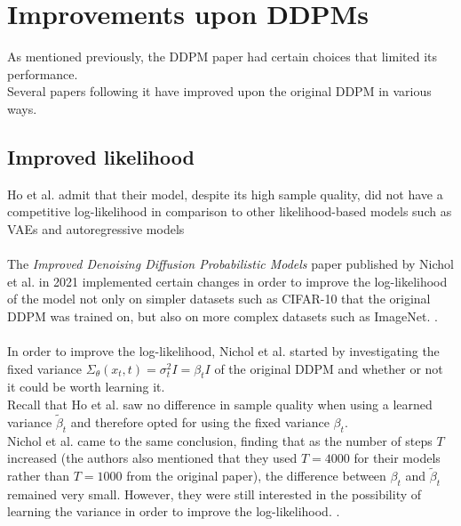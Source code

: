 \documentclass[twoside]{article}
\numberwithin{equation}{section}
\numberwithin{figure}{section}
\begin{document}
\newpage
\section{Improvements upon DDPMs} \label{improvements}

As mentioned previously, the DDPM paper \cite{ho2020denoising} had certain choices that limited its performance.\\
Several papers \cite{nichol2021improved, song2022denoising} following it have improved upon the original DDPM in various ways.

\subsection{Improved likelihood}
Ho et al. \cite{ho2020denoising} admit that their model, despite its high sample quality, did not have a competitive log-likelihood in comparison to other likelihood-based models such as VAEs and autoregressive models \cite{nichol2021improved}
\\\\
The \textit{Improved Denoising Diffusion Probabilistic Models} paper published by Nichol et al. \cite{nichol2021improved} in 2021 implemented certain changes in order to improve the log-likelihood of the model not only on simpler datasets such as CIFAR-10 \cite{cifar10} that the original DDPM was trained on, but also on more complex datasets such as ImageNet. \cite{kingma2022autoencoding, oord2016conditional, nichol2021improved}.
\\\\
In order to improve the log-likelihood, Nichol et al. \cite{nichol2021improved} started by investigating the fixed variance $\Sigma_\theta (x_t, t) = \sigma_t^2 I = \beta_t I$ of the original DDPM and whether or not it could be worth learning it. \\
Recall that Ho et al. \cite{ho2020denoising} saw no difference in sample quality when using a learned variance $\tilde{\beta}_t$ and therefore opted for using the fixed variance $\beta_t$. \\
Nichol et al. \cite{nichol2021improved} came to the same conclusion, finding that as the number of steps $T$ increased (the authors also mentioned that they used $T = 4000$ for their models rather than $T = 1000$ from the original paper), the difference between $\beta_t$ and $\tilde{\beta}_t$ remained very small. However, they were still interested in the possibility of learning the variance in order to improve the log-likelihood. \cite{nichol2021improved}. \\
\end{document}
